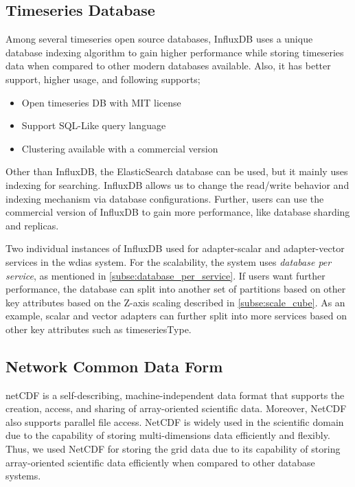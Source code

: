 \subsection{Timeseries Database}
\label{subse:influxdb}

Among several timeseries open source databases, InfluxDB \cite{influxdbInfluxDBDocumentation} uses a unique database indexing algorithm to gain higher performance while storing timeseries data when compared to other modern databases available. Also, it has better support, higher usage, and following supports;

\begin{itemize}
  \item Open timeseries DB with MIT license
  \item Support SQL-Like query language
  \item Clustering available with a commercial version
\end{itemize}

Other than InfluxDB, the ElasticSearch database can be used, but it mainly uses indexing for searching. InfluxDB allows us to change the read/write behavior and indexing mechanism via database configurations. Further, users can use the commercial version of InfluxDB to gain more performance, like database sharding and replicas.

Two individual instances of InfluxDB used for adapter-scalar and adapter-vector services in the \acrshort{wdias} system. For the scalability, the system uses \emph{database per service}, as mentioned in \cref{subse:database_per_service}. If users want further performance, the database can split into another set of partitions based on other key attributes based on the Z-axis scaling described in \cref{subse:scale_cube}. As an example, scalar and vector adapters can further split into more services based on other key attributes such as timeseriesType.

\subsection{Network Common Data Form}
\label{subse:netcdf}

\acrshort{netCDF} \cite{unidataUnidataNetCDF} is a self-describing, machine-independent data format that supports the creation, access, and sharing of array-oriented scientific data. Moreover, NetCDF also supports parallel file access. NetCDF is widely used in the scientific domain due to the capability of storing multi-dimensions data efficiently and flexibly. Thus, we used NetCDF for storing the grid data due to its capability of storing array-oriented scientific data efficiently when compared to other database systems.

